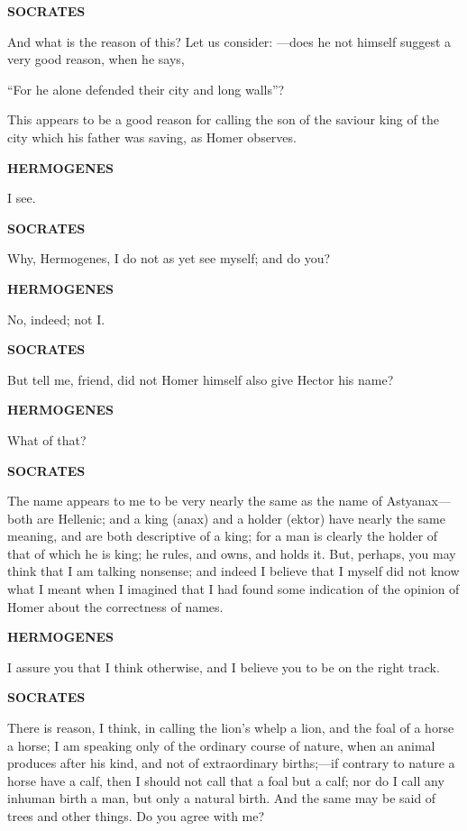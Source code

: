 \documentclass[11pt,letter]{article}
\begin{document}
\par \textbf{SOCRATES}
\par   And what is the reason of this? Let us consider: —does he not himself suggest a very good reason, when he says,

\par  “For he alone defended their city and long walls”?

\par  This appears to be a good reason for calling the son of the saviour king of the city which his father was saving, as Homer observes.

\par \textbf{HERMOGENES}
\par   I see.

\par \textbf{SOCRATES}
\par   Why, Hermogenes, I do not as yet see myself; and do you?

\par \textbf{HERMOGENES}
\par   No, indeed; not I.

\par \textbf{SOCRATES}
\par   But tell me, friend, did not Homer himself also give Hector his name?

\par \textbf{HERMOGENES}
\par   What of that?

\par \textbf{SOCRATES}
\par   The name appears to me to be very nearly the same as the name of Astyanax—both are Hellenic; and a king (anax) and a holder (ektor) have nearly the same meaning, and are both descriptive of a king; for a man is clearly the holder of that of which he is king; he rules, and owns, and holds it. But, perhaps, you may think that I am talking nonsense; and indeed I believe that I myself did not know what I meant when I imagined that I had found some indication of the opinion of Homer about the correctness of names.

\par \textbf{HERMOGENES}
\par   I assure you that I think otherwise, and I believe you to be on the right track.

\par \textbf{SOCRATES}
\par   There is reason, I think, in calling the lion’s whelp a lion, and the foal of a horse a horse; I am speaking only of the ordinary course of nature, when an animal produces after his kind, and not of extraordinary births;—if contrary to nature a horse have a calf, then I should not call that a foal but a calf; nor do I call any inhuman birth a man, but only a natural birth. And the same may be said of trees and other things. Do you agree with me?
\end{document}
